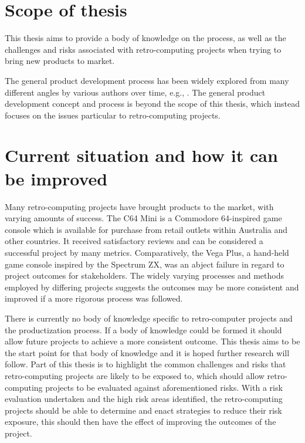 \section{Scope of thesis}
This thesis aims to provide a body of knowledge on the process, as well as the challenges and risks associated with retro-computing projects when trying to bring new products to market. 

The general product development process has been widely explored from many different angles by various authors over time, e.g., \cite{veryzer1998discontinuous,imai1984managing,schilling1998managing,morgan2006toyota,zahay2018managerial,sommer2015improved,stark2015product,rajagopalan2017exploring,chahin2016practical}.  The general product development concept and process is beyond the scope of this thesis, which instead focuses on the issues particular to retro-computing projects.

\section{Current situation and how it can be improved}
Many retro-computing projects have brought products to the market, with varying amounts of success. The C64 Mini is a Commodore 64-inspired game console which is available for purchase from retail outlets within Australia and other countries. It received satisfactory reviews and can be considered a successful project by many metrics. Comparatively, the Vega Plus, a hand-held game console inspired by the Spectrum ZX, was an abject failure in regard to project outcomes for stakeholders. The widely varying processes and methods employed by differing projects suggests the outcomes may be more consistent and improved if a more rigorous process was followed. 

There is currently no body of knowledge specific to retro-computer projects and the productization process. If a body of knowledge could be formed it should allow future projects to achieve a more consistent outcome. This thesis aims to be the start point for that body of knowledge and it is hoped further research will follow. Part of this thesis is to highlight the common challenges and risks that retro-computing projects are likely to be exposed to, which should allow retro-computing projects to be evaluated against aforementioned risks. With a risk evaluation undertaken and the high risk areas identified, the retro-computing projects should be able to determine and enact strategies to reduce their risk exposure, this should then have the effect of improving the outcomes of the project.

